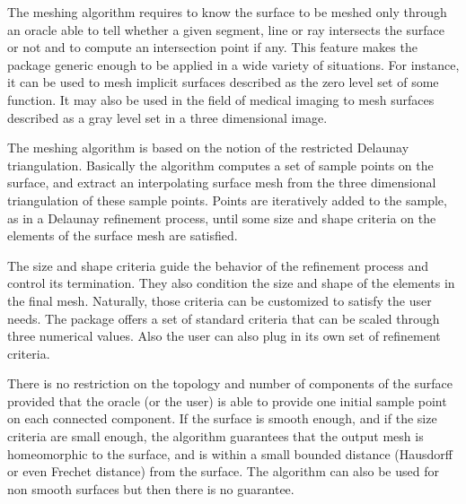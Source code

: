 The meshing algorithm requires to know the surface to be meshed
only  through an oracle able to  tell whether a
given segment, line or ray intersects the surface or not
and to compute an intersection point if any.
This feature makes the package generic enough to be
applied in a wide variety of situations. For instance, it can be
used to mesh implicit surfaces described as the zero level set
of some function. It may also be used in the field of medical imaging
to mesh surfaces described as a gray
level set in a three dimensional image.




The meshing algorithm is based on the notion of the restricted
Delaunay triangulation. Basically the algorithm  computes a set of
sample points on the surface, and extract an interpolating
surface mesh  from the three dimensional triangulation of these
sample points.
Points are iteratively added to the sample,
as in a Delaunay refinement process, until some size and shape
criteria on the elements of the surface mesh
are satisfied.


The size and shape criteria guide the  behavior of
the refinement process and control its termination.
They also condition  the size and shape of the elements in the final
mesh. Naturally, those criteria can be customized to satisfy
the user needs. The  package offers
a set of standard criteria that can be scaled through
three numerical values. Also the user can also plug in its own
set of refinement criteria.

There is no restriction on the topology and number of components
of the surface provided that the oracle (or the user)
is able to provide one initial sample point on each connected component.
If the surface is smooth enough, and if the size criteria are
small enough, the algorithm guarantees
that the output mesh is homeomorphic to the
surface, and  is within a small bounded distance
(Hausdorff or even Frechet distance) from the surface.
The algorithm can also be used for non smooth surfaces
but then there is no guarantee.




